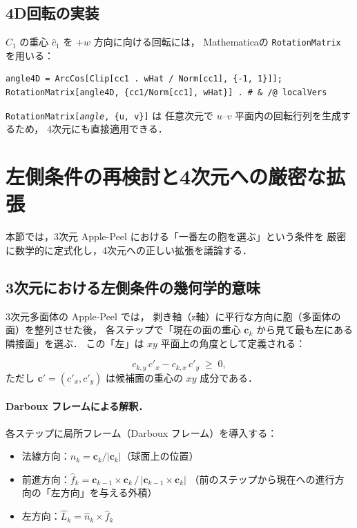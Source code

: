 \documentclass[12pt,a4paper]{article}
\theoremstyle{definition}
\begin{document}
\subsection{4D回転の実装}

$C_1$ の重心 $\hat{c}_1$ を $+w$ 方向に向ける回転には，
Mathematicaの \texttt{RotationMatrix} を用いる：

\begin{lstlisting}
angle4D = ArcCos[Clip[cc1 . wHat / Norm[cc1], {-1, 1}]];
RotationMatrix[angle4D, {cc1/Norm[cc1], wHat}] . # & /@ localVers
\end{lstlisting}

\noindent \texttt{RotationMatrix[\textit{angle}, \{u, v\}]} は
任意次元で $u$--$v$ 平面内の回転行列を生成するため，
4次元にも直接適用できる．


\section{左側条件の再検討と4次元への厳密な拡張}
\label{sec:left}

本節では，3次元 Apple-Peel における「一番左の胞を選ぶ」という条件を
厳密に数学的に定式化し，4次元への正しい拡張を議論する．

\subsection{3次元における左側条件の幾何学的意味}

3次元多面体の Apple-Peel では，
剥き軸（z軸）に平行な方向に胞（多面体の面）を整列させた後，
各ステップで「現在の面の重心 $\mathbf{c}_k$ から見て最も左にある隣接面」を選ぶ．
この「左」は $xy$ 平面上の角度として定義される：

\begin{equation}
  c_{k,y}\, c'_x - c_{k,x}\, c'_y \;\ge\; 0,
  \label{eq:3dleft}
\end{equation}
ただし $\mathbf{c}' = (c'_x, c'_y)$ は候補面の重心の $xy$ 成分である．

\paragraph{Darboux フレームによる解釈．}
各ステップに局所フレーム（Darboux フレーム）を導入する：
\begin{itemize}
  \item 法線方向：$\hat{n}_k = \mathbf{c}_k / |\mathbf{c}_k|$（球面上の位置）
  \item 前進方向：$\hat{f}_k = \mathbf{c}_{k-1} \times \mathbf{c}_k \,/\, |\mathbf{c}_{k-1} \times \mathbf{c}_k|$
  （前のステップから現在への進行方向の「左方向」を与える外積）
  \item 左方向：$\hat{L}_k = \hat{n}_k \times \hat{f}_k$
\end{itemize}
\end{document}

